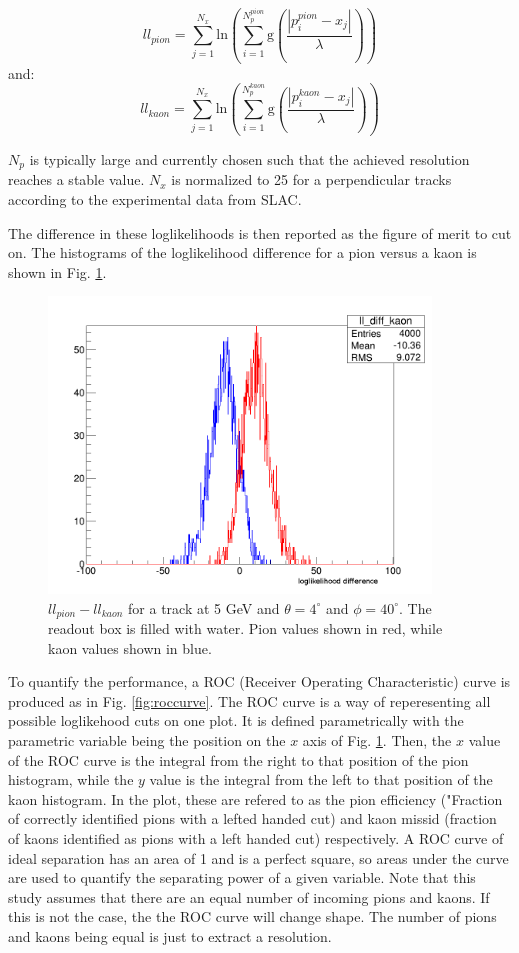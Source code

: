 \documentclass[11pt]{article}
\begin{document}
\begin{equation}
ll_{pion} = \sum\limits_{j=1}^{N_x} \textrm{ln}(\sum\limits_{i=1}^{N^{pion}_{p}} \textrm{g}(\frac{|p^{pion}_{i}-x_j|}{\lambda}))
\end{equation}
and:
\begin{equation}
ll_{kaon} = \sum\limits_{j=1}^{N_x} \textrm{ln}(\sum\limits_{i=1}^{N^{kaon}_{p}} \textrm{g}(\frac{|p^{kaon}_{i}-x_j|}{\lambda}))
\end{equation}

$N_p$ is typically large and currently chosen such that the achieved resolution reaches a stable value.  $N_x$ is normalized to 25 for a perpendicular tracks according to the experimental data from SLAC.

The difference in these loglikelihoods is then reported as the figure of merit to cut on.  The histograms of the loglikelihood difference for a pion versus a kaon is shown in Fig. \ref{fig:llhistos}.

\begin{figure}
\centering
\includegraphics[width=4in]{pngs/ll_diffs.png}
\caption{$ll_{pion} - ll_{kaon}$ for a track at 5 GeV and $\theta=4^{\circ}$ and $\phi=40^{\circ}$.  The readout box is filled with water.  Pion values shown in red, while kaon values shown in blue. \label{fig:llhistos}}
\end{figure}

To quantify the performance, a ROC (Receiver Operating Characteristic) curve is produced as in Fig. \ref{fig:roccurve}.  The ROC curve is a way of reperesenting all possible loglikehood cuts on one plot.  It is defined parametrically with the parametric variable being the position on the $x$ axis of Fig. \ref{fig:llhistos}.  Then, the $x$ value of the ROC curve is the integral from the right to that position of the pion histogram, while the $y$ value is the integral from the left to that position of the kaon histogram.  In the plot, these are refered to as the pion efficiency ("Fraction of correctly identified pions with a lefted handed cut) and kaon missid (fraction of kaons identified as pions with a left handed cut) respectively.  A ROC curve of ideal separation has an area of 1 and is a perfect square, so areas under the curve are used to quantify the separating power of a given variable.  Note that this study assumes that there are an equal number of incoming pions and kaons.  If this is not the case, the the ROC curve will change shape.  The number of pions and kaons being equal is just to extract a resolution.
\end{document}
